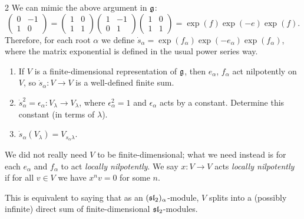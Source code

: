 \begin{sketch}{2}
We can mimic the above argument in $\g$:
\[
  \begin{pmatrix} 0 & -1 \\ 1 & 0 \end{pmatrix}
  = \begin{pmatrix} 1 & 0 \\ 1 & 1 \end{pmatrix}
    \begin{pmatrix} 1 & -1 \\ 0 & 1 \end{pmatrix}
    \begin{pmatrix} 1 & 0 \\ 1 & 1 \end{pmatrix}
  = \exp(f)\exp(-e)\exp(f).
\]
Therefore, for each root $\alpha$ we define
$\dot s_\alpha = \exp(f_\alpha)\exp(-e_\alpha)\exp(f_\alpha)$, where the
matrix exponential is defined in the usual power series way.

\begin{exercise}\leavevmode
\begin{enumerate}
  \item If $V$ is a finite-dimensional representation of $\g$, then
    $e_\alpha$, $f_\alpha$ act nilpotently on $V$, so
    $\dot s_\alpha\colon V \to V$ is a well-defined finite sum.
  \item $\dot s_\alpha^2 = \epsilon_\alpha\colon V_\lambda \to V_\lambda$,
    where $\epsilon_\alpha^2 = 1$ and $\epsilon_\alpha$ acts by a constant.
    Determine this constant (in terms of $\lambda$).
  \item $\dot s_\alpha(V_\lambda) = V_{s_\alpha\lambda}$.
  \qedhere
\end{enumerate}
\end{exercise}
\end{sketch}

\begin{remark}
We did not really need $V$ to be finite-dimensional; what we need instead is
for each $e_\alpha$ and $f_\alpha$ to act \emph{locally nilpotently}. We say
$x\colon V \to V$ acts \emph{locally nilpotently} if for all $v \in V$ we have
$x^nv = 0$ for some $n$.
\end{remark}

\begin{exercise}
This is equivalent to saying that as an $(\sl_2)_\alpha$-module, $V$ splits
into a (possibly infinite) direct sum of finite-dimensional $\sl_2$-modules.
\end{exercise}

